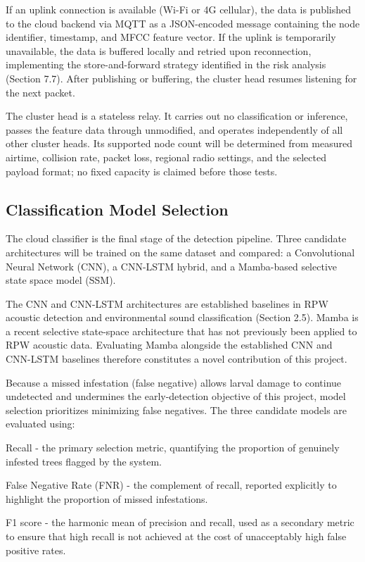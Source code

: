 \documentclass[12pt,a4paper,oneside]{memoir}
\newcommand{\newrevision}[1]{\textcolor{green!45!black}{#1}}
\begin{document}
If an uplink connection is available (Wi-Fi or 4G cellular), the data is published to the cloud backend via MQTT as a JSON-encoded message containing the node identifier, timestamp, and MFCC feature vector. If the uplink is temporarily unavailable, the data is buffered locally and retried upon reconnection, implementing the store-and-forward strategy identified in the risk analysis (Section 7.7). After publishing or buffering, the cluster head resumes listening for the next packet.

\newrevision{The cluster head is a stateless relay. It carries out no classification or inference, passes the feature data through unmodified, and operates independently of all other cluster heads. Its supported node count will be determined from measured airtime, collision rate, packet loss, regional radio settings, and the selected payload format; no fixed capacity is claimed before those tests.}

\subsection{Classification Model Selection}
The cloud classifier is the final stage of the detection pipeline. Three candidate architectures will be trained on the same dataset and compared: a Convolutional Neural Network (CNN), a CNN-LSTM hybrid, and a Mamba-based selective state space model (SSM).

The CNN and CNN-LSTM architectures are established baselines in RPW acoustic detection and environmental sound classification (Section 2.5). Mamba is a recent selective state-space architecture \cite{gu2024mamba} that has not previously been applied to RPW acoustic data. Evaluating Mamba alongside the established CNN and CNN-LSTM baselines therefore constitutes a novel contribution of this project.

Because a missed infestation (false negative) allows larval damage to continue undetected and undermines the early-detection objective of this project, model selection prioritizes minimizing false negatives. The three candidate models are evaluated using:

Recall - the primary selection metric, quantifying the proportion of genuinely infested trees flagged by the system.

False Negative Rate (FNR) - the complement of recall, reported explicitly to highlight the proportion of missed infestations.

F1 score - the harmonic mean of precision and recall, used as a secondary metric to ensure that high recall is not achieved at the cost of unacceptably high false positive rates.
\end{document}
